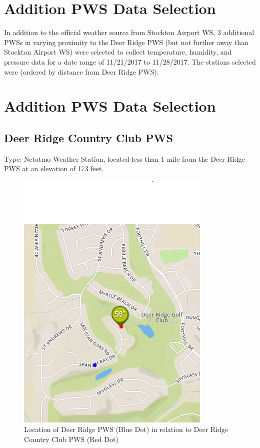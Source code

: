 \documentclass[sigconf]{acmart}
\begin{document}
\section{Addition PWS Data Selection}

In addition to the official weather source from Stockton Airport WS, 3 additional PWSs in varying proximity to the Deer Ridge PWS (but not further away than Stockton Airport WS) were selected to collect temperature, humidity, and pressure data for a date range of 11/21/2017 to 11/28/2017. The stations selected were (ordered by distance from Deer Ridge PWS):

\section{Addition PWS Data Selection} 

\subsection{Deer Ridge Country Club PWS}

Type: Netatmo Weather Station, located less than 1 mile from the Deer Ridge PWS at an elevation of 173 feet.

\begin{figure}[H]
    \centering
    \includegraphics[width=\columnwidth]{images/DR_DRCC.PNG}
    \caption{Location of Deer Ridge PWS (Blue Dot) in relation to Deer Ridge Country Club PWS (Red Dot)}
\end{figure}
\end{document}
